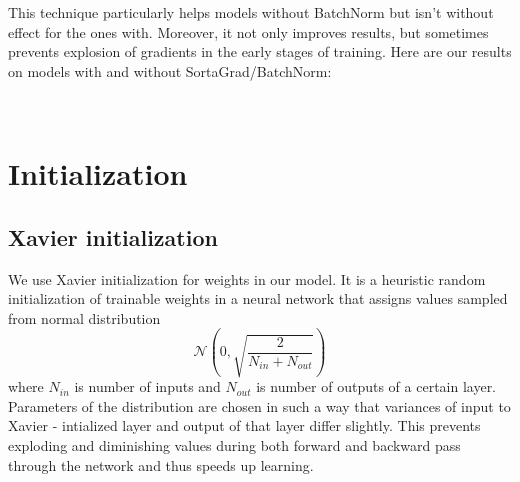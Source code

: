 \documentclass[licencjacka,en]{pracamgr}
\newcommand{\todoplot}[1]{
\ \\
\noindent%
\begin{minipage}{\linewidth}%
\makebox[\linewidth]{%
		\begin{tikzpicture}
		\begin{axis}[
            ymin = 0, ymax = 5,
            xmin = 0, xmax = 600,
            minor y tick num = 4,
            minor x tick num = 1,
            ymajorgrids = true,
            grid style = dashed,
            scaled x ticks = false,
            xlabel = TODO,
            ylabel = TODO,
            legend pos=outer north east,
            no markers
          ]
		  \addplot table[x=epochs,y=training]{\first};
		  \addlegendentry{TODO}

		\end{axis}
		\end{tikzpicture}
		}\captionof{figure}{#1}\label{diag:time}     
\end{minipage}
}
\begin{document}
This technique particularly helps models without BatchNorm but isn't without effect for the ones with. Moreover, it not only improves results, but sometimes prevents explosion of gradients in the early stages of training. Here are our results on models with and without SortaGrad/BatchNorm:

\todoplot{TODO}

\section{Initialization}
\xavier

\subsection{Xavier initialization}
We use Xavier initialization \cite{XAVIER} for weights in our model. It is a heuristic random initialization of trainable weights in a neural network that assigns values sampled from normal distribution $$\mathcal{N}\left(0, \sqrt{\frac{2}{N_{in} + N_{out}}}\right)$$ where $N_{in}$ is number of inputs and $N_{out}$ is number of outputs of a certain layer. Parameters of the distribution are chosen in such a way that variances of input to Xavier - intialized layer and output of that layer differ slightly. This prevents exploding and diminishing values during both forward and backward pass through the network and thus speeds up learning.
\end{document}
